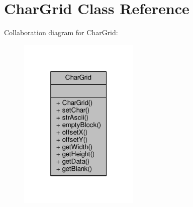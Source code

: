 \hypertarget{classCharGrid}{}\section{Char\+Grid Class Reference}
\label{classCharGrid}


Collaboration diagram for Char\+Grid\+:
\nopagebreak
\begin{figure}[H]
\begin{center}
\leavevmode
\includegraphics[width=163pt]{classCharGrid__coll__graph}
\end{center}
\end{figure}
